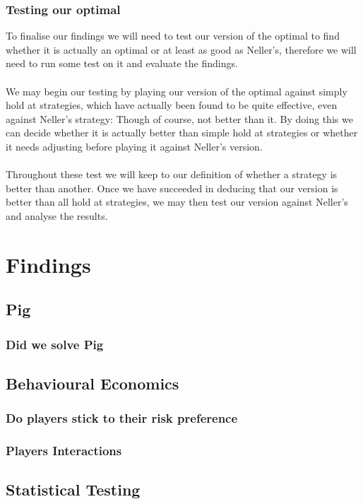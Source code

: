 \documentclass[a4paper,titlepage]{article}
\begin{document}
\subsubsection{Testing our optimal}
To finalise our findings we will need to test our version of the optimal to find whether it is actually an optimal or at least as good as Neller’s\citep{neller2004optimal}, therefore we will need to run some test on it and evaluate the findings.\\ \\
We may begin our testing by playing our version of the optimal against simply hold at strategies, which have actually been found to be quite effective, even against Neller’s strategy:  Though of course, not better than it. By doing this we can decide whether it is actually better than simple hold at strategies or whether it needs adjusting before playing it against Neller’s version.\\ \\
Throughout these test we will keep to our definition of whether a strategy is better than another. Once we have succeeded in deducing that our version is better than all hold at strategies, we may then test our version against Neller’s and analyse the results. 


\section{Findings}
\subsection{Pig}
\subsubsection{Did we solve Pig}

\subsection{Behavioural Economics}
\subsubsection{Do players stick to their risk preference}
\subsubsection{Players Interactions}

\subsection{Statistical Testing}
\end{document}
